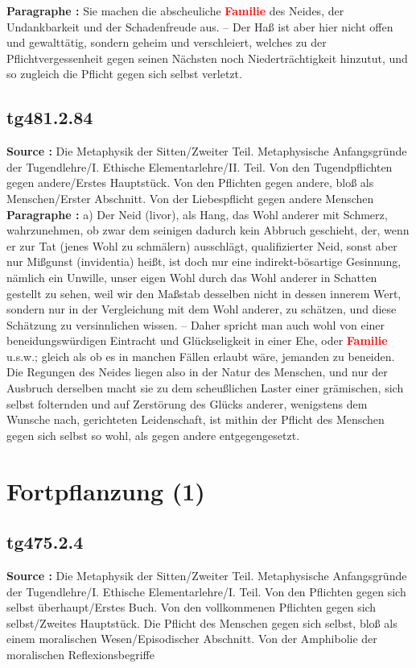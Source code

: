 \documentclass[a4paper,12pt,twoside]{book}
\newcommand{\match}[1]{\textcolor{red}{\textbf{#1}}}
\newcommand{\unnumberedsection}[1]{
	\section*{#1}
	\addcontentsline{toc}{section}{#1}
	\markright{#1}
}
\begin{document}
	\textbf{Paragraphe : }Sie machen die abscheuliche \match{Familie} des Neides, der Undankbarkeit und der Schadenfreude aus. – Der Haß ist aber hier nicht offen und gewalttätig, sondern geheim und verschleiert, welches zu der Pflichtvergessenheit gegen seinen Nächsten noch Niederträchtigkeit hinzutut, und so zugleich die Pflicht gegen sich selbst verletzt. 
	
	\subsection*{tg481.2.84} 
	\textbf{Source : }Die Metaphysik der Sitten/Zweiter Teil. Metaphysische Anfangsgründe der Tugendlehre/I. Ethische Elementarlehre/II. Teil. Von den Tugendpflichten gegen andere/Erstes Hauptstück. Von den Pflichten gegen andere, bloß als Menschen/Erster Abschnitt. Von der Liebespflicht gegen andere Menschen\\  
	
	\textbf{Paragraphe : }a) Der Neid (livor), als Hang, das Wohl anderer mit Schmerz, wahrzunehmen, ob zwar dem seinigen dadurch kein Abbruch geschieht, der, wenn er zur Tat (jenes Wohl zu schmälern) ausschlägt, qualifizierter Neid, sonst aber nur Mißgunst (invidentia) heißt, ist doch nur eine indirekt-bösartige Gesinnung, nämlich ein Unwille, unser eigen Wohl durch das Wohl anderer in Schatten gestellt zu sehen, weil wir den Maßstab desselben nicht in dessen innerem Wert, sondern nur in der Vergleichung mit dem Wohl anderer, zu schätzen, und diese Schätzung zu versinnlichen wissen. – Daher spricht man auch wohl von einer beneidungswürdigen Eintracht und Glückseligkeit in einer Ehe, oder \match{Familie} u.s.w.; gleich als ob es in manchen Fällen erlaubt wäre, jemanden zu beneiden. Die Regungen des Neides liegen also in der Natur des Menschen, und nur der Ausbruch derselben macht sie zu dem scheußlichen Laster einer grämischen, sich selbst folternden und auf Zerstörung des Glücks anderer, wenigstens dem Wunsche nach, gerichteten Leidenschaft, ist mithin der Pflicht des Menschen gegen sich selbst so wohl, als gegen andere entgegengesetzt. 
	
	\unnumberedsection{Fortpflanzung (1)} 
	\subsection*{tg475.2.4} 
	\textbf{Source : }Die Metaphysik der Sitten/Zweiter Teil. Metaphysische Anfangsgründe der Tugendlehre/I. Ethische Elementarlehre/I. Teil. Von den Pflichten gegen sich selbst überhaupt/Erstes Buch. Von den vollkommenen Pflichten gegen sich selbst/Zweites Hauptstück. Die Pflicht des Menschen gegen sich selbst, bloß als einem moralischen Wesen/Episodischer Abschnitt. Von der Amphibolie der moralischen Reflexionsbegriffe\\  
	
\end{document}
